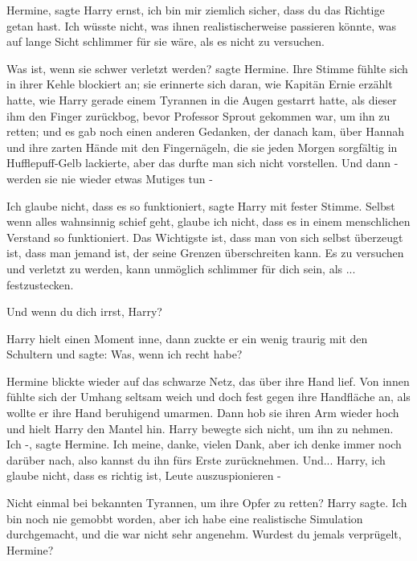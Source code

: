\glqq{}Hermine\grqq{}, sagte Harry ernst, \glqq{}ich bin mir ziemlich sicher, dass
du das Richtige getan hast. Ich wüsste nicht, was ihnen realistischerweise
passieren könnte, was auf lange Sicht schlimmer für sie wäre, als es nicht zu
versuchen.\grqq{}

\glqq{}Was ist, wenn sie schwer verletzt werden?\grqq{} sagte Hermine. Ihre
Stimme fühlte sich in ihrer Kehle blockiert an; sie erinnerte sich daran, wie
Kapitän Ernie erzählt hatte, wie Harry gerade einem Tyrannen in die Augen
gestarrt hatte, als dieser ihm den Finger zurückbog, bevor Professor Sprout
gekommen war, um ihn zu retten; und es gab noch einen anderen Gedanken, der
danach kam, über Hannah und ihre zarten Hände mit den Fingernägeln, die sie
jeden Morgen sorgfältig in Hufflepuff-Gelb lackierte, aber das durfte man sich
nicht vorstellen. \glqq{}Und dann - werden sie nie wieder etwas Mutiges tun
-\grqq{}

\glqq{}Ich glaube nicht, dass es so funktioniert\grqq{}, sagte Harry mit fester
Stimme. \glqq{}Selbst wenn alles wahnsinnig schief geht, glaube ich nicht, dass
es in einem menschlichen Verstand so funktioniert. Das Wichtigste ist, dass man
von sich selbst überzeugt ist, dass man jemand ist, der seine Grenzen
überschreiten kann. Es zu versuchen und verletzt zu werden, kann unmöglich
schlimmer für dich sein, als ... festzustecken.\grqq{}

\glqq{}Und wenn du dich irrst, Harry?\grqq{}

Harry hielt einen Moment inne, dann zuckte er ein wenig traurig mit den
Schultern und sagte: \glqq{}Was, wenn ich recht habe?\grqq{}

Hermine blickte wieder auf das schwarze Netz, das über ihre Hand lief. Von innen
fühlte sich der Umhang seltsam weich und doch fest gegen ihre Handfläche an, als
wollte er ihre Hand beruhigend umarmen. Dann hob sie ihren Arm wieder hoch und
hielt Harry den Mantel hin. Harry bewegte sich nicht, um ihn zu nehmen. \glqq{}
Ich -\grqq{}, sagte Hermine. \glqq{}Ich meine, danke, vielen Dank, aber ich denke
immer noch darüber nach, also kannst du ihn fürs Erste zurücknehmen. Und...
Harry, ich glaube nicht, dass es richtig ist, Leute auszuspionieren -\grqq{}

\glqq{}Nicht einmal bei bekannten Tyrannen, um ihre Opfer zu retten?\grqq{} Harry
sagte. \glqq{}Ich bin noch nie gemobbt worden, aber ich habe eine realistische
Simulation durchgemacht, und die war nicht sehr angenehm. Wurdest du jemals
verprügelt, Hermine?\grqq{}

